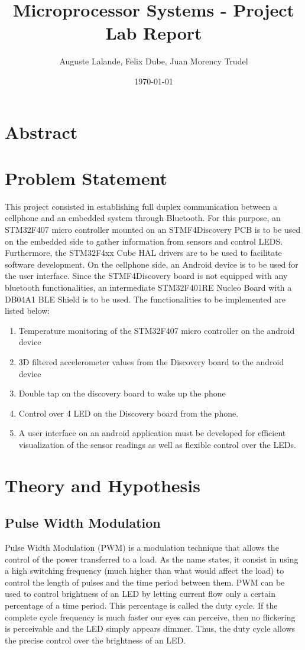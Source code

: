\documentclass[12pt]{article}
\title{Microprocessor Systems - Project Lab Report}
\author{Auguste Lalande, Felix Dube, Juan Morency Trudel}
\date{\today}
\begin{document}
\maketitle
\clearpage

\tableofcontents
\clearpage

\section{Abstract}

\section{Problem Statement}
This project consisted in establishing full duplex communication between a cellphone and an embedded system through Bluetooth. For this purpose, an STM32F407 micro controller mounted on an STMF4Discovery PCB is to be used on the embedded side to gather information from sensors and control LEDS. Furthermore,  the STM32F4xx Cube HAL drivers are to be used to facilitate software development. On the cellphone side, an Android device is to be used for the user interface. Since the STMF4Discovery board is not equipped with any bluetooth functionalities, an intermediate STM32F401RE Nucleo Board with a DB04A1 BLE Shield is to be used. The functionalities to be implemented are listed below:

\begin{enumerate}
\item Temperature monitoring of the STM32F407 micro controller on the android device
\item 3D filtered accelerometer values from the Discovery board to the android device
\item Double tap on the discovery board to wake up the phone
\item Control over 4 LED on the Discovery board from the phone.
\item A user interface on an android application must be developed for efficient visualization of the sensor readings as well as flexible control over the LEDs. 
\end{enumerate}
\section{Theory and Hypothesis}
\subsection{Pulse Width Modulation}
Pulse Width Modulation (PWM) is a modulation technique that allows the control of the power transferred to a load. As the name states, it consist in using a high switching frequency (much higher than what would affect the load) to control the length of pulses and the time period between them. PWM can be used to control brightness of an LED by letting current flow only a certain percentage of a time period. This percentage is called the duty cycle. If the complete cycle frequency is much faster our eyes can perceive, then no flickering is perceivable and the LED simply appears dimmer. Thus, the duty cycle allows the precise control over the brightness of an LED. 
\end{document}
